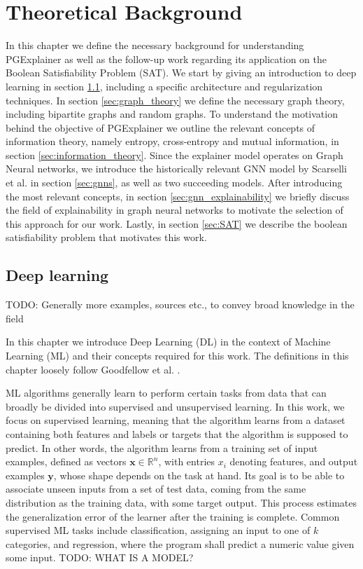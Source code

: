 \chapter{Theoretical Background}
\label{ch:Background}
In this chapter we define the necessary background for understanding PGExplainer as well as the follow-up work regarding its application on the Boolean Satisfiability Problem (SAT). We start by giving an introduction to deep learning in section \ref{sec:deep_learning}, including a specific architecture and regularization techniques. In section \ref{sec:graph_theory} we define the necessary graph theory, including bipartite graphs and random graphs. To understand the motivation behind the objective of PGExplainer we outline the relevant concepts of information theory, namely entropy, cross-entropy and mutual information, in section \ref{sec:information_theory}. Since the explainer model operates on Graph Neural networks, we introduce the historically relevant GNN model by Scarselli et al. \cite{4700287} in section \ref{sec:gnns}, as well as two succeeding models. After introducing the most relevant concepts, in section \ref{sec:gnn_explainability} we briefly discuss the field of explainability in graph neural networks to motivate the selection of this approach for our work. Lastly, in section \ref{sec:SAT} we describe the boolean satisfiability problem that motivates this work.

\section{Deep learning}
\label{sec:deep_learning}
TODO: Generally more examples, sources etc., to convey broad knowledge in the field

In this chapter we introduce Deep Learning (DL) in the context of Machine Learning (ML) and their concepts required for this work. The definitions in this chapter loosely follow Goodfellow et al. \cite{Goodfellow-et-al-2016}.

ML algorithms generally learn to perform certain tasks from data that can broadly be divided into supervised and unsupervised learning. In this work, we focus on supervised learning, meaning that the algorithm learns from a dataset containing both features and labels or targets that the algorithm is supposed to predict. In other words, the algorithm learns from a training set of input examples, defined as vectors $\mathbf{x} \in \mathbb{R}^n$, with entries $x_i$ denoting features, and output examples $\mathbf{y}$, whose shape depends on the task at hand. Its goal is to be able to associate unseen inputs from a set of test data, coming from the same distribution as the training data, with some target output. This process estimates the generalization error of the learner after the training is complete. 
Common supervised ML tasks include classification, assigning an input to one of $k$ categories, and regression, where the program shall predict a numeric value given some input. 
TODO: WHAT IS A MODEL?

